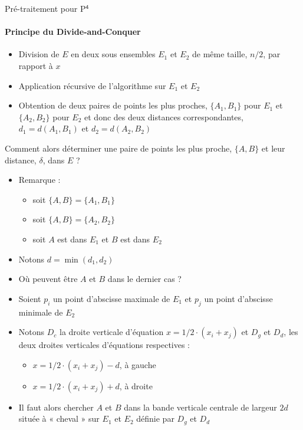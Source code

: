 \documentclass[aspectratio=1610,francais,envcountsect]{beamer}
\begin{document}
\begin{frame}[allowframebreaks]{Pré-traitement pour P$^\mathsf{4}$
    \insertcontinuationtext}

  \framesubtitle{Principe du Divide-and-Conquer}

  \begin{itemize}
  \item Division de $E$ en deux sous ensembles $E_1$ et $E_2$ de même
    taille, $n/2$, par rapport à $x$
  \item Application récursive de l’algorithme sur $E_1$ et $E_2$
  \item Obtention de deux paires de points les plus proches,
    $\{A_1, B_1\}$ pour $E_1$ et $\{A_2, B_2\}$ pour $E_2$ et donc des
    deux distances correspondantes, $d_1 = d(A_1, B_1)$ et
    $d_2 = d(A_2, B_2)$
  \end{itemize}

  Comment alors déterminer une paire de points les plus proche,
  $\{A, B\}$ et leur distance, $\delta$, dans $E$ ?

  \begin{itemize}
  \item Remarque :
    \begin{itemize}
    \item soit $\{A, B\} = \{A_1, B_1\}$
    \item soit $\{A, B\} = \{A_2, B_2\}$
    \item soit $A$ est dans $E_1$ et $B$ est dans $E_2$
    \end{itemize}
  \end{itemize}
  
  \framebreak
  
  \begin{itemize}
  \item Notons $d = \min (d_1, d_2)$
  \item Où peuvent être $A$ et $B$ dans le dernier cas ?
  \item Soient $p_i$ un point d’abscisse maximale de $E_1$ et $p_j$ un
    point d’abscisse minimale de $E_2$
  \item Notons $D_c$ la droite verticale d’équation
    $x = 1/2\cdot (x_i + x_j)$ et $D_g$ et $D_d$, les deux droites
    verticales d’équations respectives :
    \begin{itemize}
    \item $x = 1/2\cdot (x_i + x_j) - d$, à gauche
    \item $x = 1/2 \cdot (x_i + x_j) + d$, à droite
    \end{itemize}
  \item Il faut alors chercher $A$ et $B$ dans la bande verticale
    centrale de largeur $2d$ située à « cheval » sur $E_1$ et $E_2$
    définie par $D_g$ et $D_d$
  \end{itemize}
\end{frame}
\end{document}
